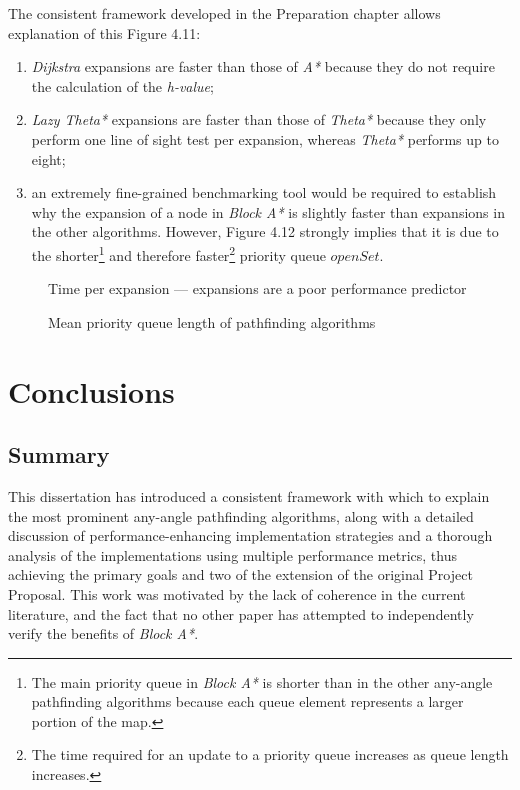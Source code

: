 \documentclass[12pt,notitlepage]{report}
\begin{document}
\noindent
The consistent framework developed in the Preparation chapter allows explanation of this Figure 4.11:
\begin{enumerate}
\item {\em Dijkstra} expansions are faster than those of {\em A*} because they do not require the calculation of the {\em h-value};
\item {\em Lazy Theta*} expansions are faster than those of {\em Theta*} because they only perform one line of sight test per expansion, whereas {\em Theta*} performs up to eight;
\item an extremely fine-grained benchmarking tool would be required to establish why the expansion of a node in {\em Block A*} is slightly faster than expansions in the other algorithms. However, Figure 4.12 strongly implies that it is due to the shorter\footnote{The main priority queue in {\em Block A*} is shorter than in the other any-angle pathfinding algorithms because each queue element represents a larger portion of the map.} and therefore faster\footnote{The time required for an update to a priority queue increases as queue length increases\cite{CormenDijkstra}.} priority queue $openSet$.
\end{enumerate}

\begin{figure}
\centering

\caption[Time per expansion of pathfinding algorithms]{Time per expansion --- expansions are a poor performance predictor}

\caption[Mean priority queue length of pathfinding algorithms]{Mean priority queue length of pathfinding algorithms}
\end{figure}

\cleardoublepage
\chapter{Conclusions}

\section{Summary}
This dissertation has introduced a consistent framework with which to explain the most prominent any-angle pathfinding algorithms, along with a detailed discussion of performance-enhancing implementation strategies and a thorough analysis of the implementations using multiple performance metrics, thus achieving the primary goals and two of the extension of the original Project Proposal. This work was motivated by the lack of coherence in the current literature, and the fact that no other paper has attempted to independently verify the benefits of {\em Block A*}.\\
\end{document}
